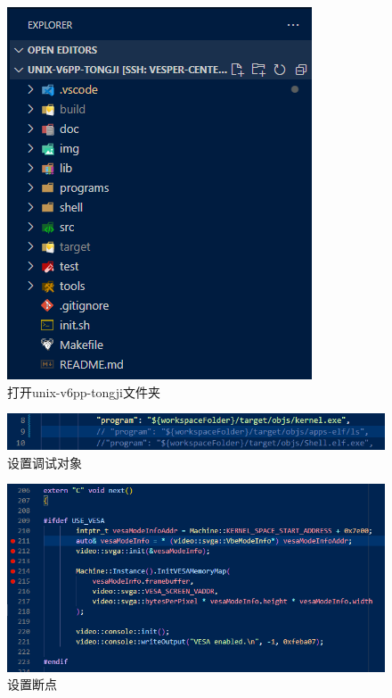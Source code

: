 \begin{figure}[!htbp]
    \centering
    \includegraphics[scale=1]{fig/folder.png}
    \caption{打开unix-v6pp-tongji文件夹}\label{folder}
\end{figure}

\begin{figure}[!htbp]
    \centering
    \includegraphics[scale=1]{fig/kernel.png}
    \caption{设置调试对象}\label{kernel}
\end{figure}

\begin{figure}[!htbp]
    \centering
    \includegraphics[scale=0.7]{fig/breakpoint.png}
    \caption{设置断点}\label{breakpoint}
\end{figure}

